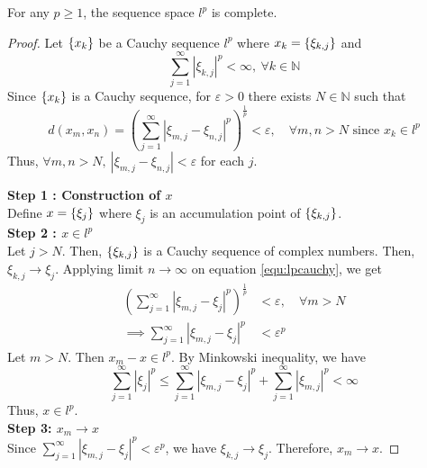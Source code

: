 \begin{theorem}
	For any $p \ge 1$, the sequence space $l^p$ is complete.
\end{theorem}
\begin{proof}
	Let $\left\{x_k\right\}$ be a Cauchy sequence $l^p$ where $x_k = \left\{\xi_{k,j}\right\}$ and
	\[ \sum_{j = 1}^\infty \left| \xi_{k,j} \right|^p < \infty,\ \forall k \in \mathbb{N} \]
	Since $\left\{x_k\right\}$ is a Cauchy sequence, for $\varepsilon > 0$ there exists $N \in \mathbb{N}$ such that
	\begin{equation}
		\label{equ:lpcauchy}
		d(x_m,x_n) = \left( \sum_{j=1}^\infty |\xi_{m,j} - \xi_{n,j}|^p \right) ^\frac{1}{p} < \varepsilon,\quad \forall m,n > N \text{ since } x_k \in l^p
	\end{equation}
	Thus, $\forall m,n > N,\ |\xi_{m,j} - \xi_{n,j}| < \varepsilon$ for each $j$.

	\textbf{Step 1 : Construction of $x$}\\
	Define $x = \left\{\xi_j\right\}$ where $\xi_j$ is an accumulation point of $\left\{\xi_{k,j}\right\}$.\\%

	\textbf{Step 2 : $x \in l^p$}\\
	Let $j > N$.
	Then, $\left\{\xi_{k,j}\right\}$ is a Cauchy sequence of complex numbers.
	Then, $\xi_{k,j} \to \xi_j$.
	Applying limit $n \to \infty$ on equation \ref{equ:lpcauchy}, we get
	\begin{align*}
		\left( \sum_{j=1}^\infty |\xi_{m,j} - \xi_j|^p \right) ^\frac{1}{p} & < \varepsilon,\quad \forall m > N \\
		\implies \sum_{j=1}^\infty |\xi_{m,j} - \xi_j|^p  & < \varepsilon^p
	\end{align*}
	Let $m > N$. Then $x_m - x \in l^p$. By Minkowski inequality, we have
	\begin{equation}
		\sum_{j=1}^\infty |\xi_j|^p  \le \sum_{j=1}^\infty |\xi_{m,j}-\xi_j|^p + \sum_{j=1}^\infty |\xi_{m,j}|^p  < \infty
	\end{equation}
	Thus, $x \in l^p$. \\
	\textbf{Step 3: $x_m \to x$}\\
	Since $\displaystyle \sum_{j=1}^\infty |\xi_{m,j} - \xi_j|^p < \varepsilon^p$, we have $\xi_{k,j} \to \xi_j$.
	Therefore, $x_m \to x$.
\end{proof}

